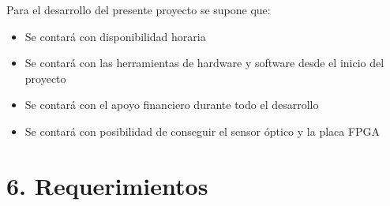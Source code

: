 \documentclass[
11pt, %
codirector, %
]{charter}
\begin{document}
Para el desarrollo del presente proyecto se supone que:

\begin{itemize}
	\item Se contará con disponibilidad horaria
	\item Se contará con las herramientas de hardware y software desde el inicio del proyecto
	\item Se contará con el apoyo financiero durante todo el desarrollo
	\item Se contará con posibilidad de conseguir el sensor óptico y la placa FPGA
\end{itemize}


\section{6. Requerimientos}
\label{sec:requerimientos}
\end{document}
